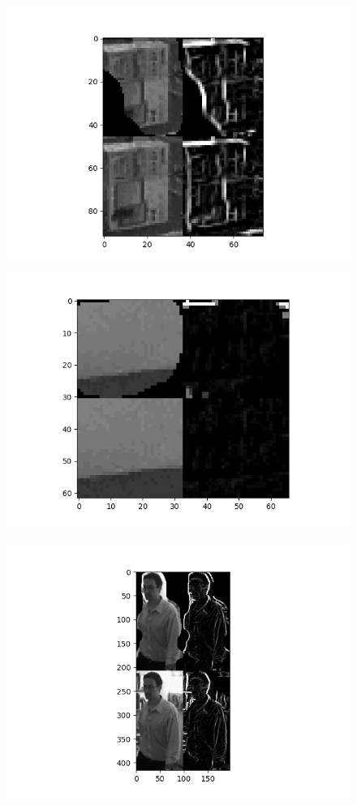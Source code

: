 \documentclass{article}
\begin{document}
\begin{figure}
    \centering
    \begin{minipage}{0.3\textwidth}
        \centering
        \includegraphics[width=\linewidth]{grad1.png}
        \includegraphics[width=\linewidth]{grad2.png}
    \end{minipage}%
    \begin{minipage}{0.7\textwidth}
        \centering
        \includegraphics[scale=0.6]{grad3.png}
    \end{minipage}


\end{figure}
\end{document}
